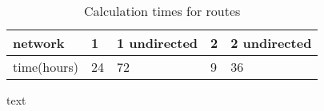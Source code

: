 \begin{table}[]
\centering
\begin{tabular}{@{}l|llll@{}}
network     & 1           & 1 undirected & 2    & 2 undirected \\ \hline
time(hours) & 24 & 72  & 9 & 36
\end{tabular}
\caption{Calculation times for routes}
\label{table:net_calc_times}
\end{table}



text